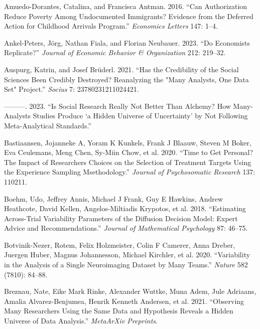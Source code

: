 \documentclass[
  letterpaper,
  DIV=11,
  numbers=noendperiod]{scrartcl}
\newlength{\cslhangindent}
\newlength{\cslentryspacingunit} %
\newenvironment{CSLReferences}[2] %
 {%
  \setlength{\parindent}{0pt}
  \ifodd #1
  \let\oldpar\par
  \def\par{\hangindent=\cslhangindent\oldpar}
  \fi
  \setlength{\parskip}{#2\cslentryspacingunit}
 }%
 {}
\begin{document}
\hypertarget{refs}{}
\begin{CSLReferences}{1}{0}
\leavevmode{}%
Amuedo-Dorantes, Catalina, and Francisca Antman. 2016. {``Can
Authorization Reduce Poverty Among Undocumented Immigrants? Evidence
from the Deferred Action for Childhood Arrivals Program.''}
\emph{Economics Letters} 147: 1--4.

\leavevmode{}%
Ankel-Peters, Jörg, Nathan Fiala, and Florian Neubauer. 2023. {``Do
Economists Replicate?''} \emph{Journal of Economic Behavior \&
Organization} 212: 219--32.

\leavevmode{}%
Auspurg, Katrin, and Josef Brüderl. 2021. {``Has the Credibility of the
Social Sciences Been Credibly Destroyed? Reanalyzing the "Many Analysts,
One Data Set" Project.''} \emph{Socius} 7: 23780231211024421.

\leavevmode{}%
---------. 2023. {``Is Social Research Really Not Better Than Alchemy?
How Many-Analysts Studies Produce {`a Hidden Universe of Uncertainty'}
by Not Following Meta-Analytical Standards.''}

\leavevmode{}%
Bastiaansen, Jojanneke A, Yoram K Kunkels, Frank J Blaauw, Steven M
Boker, Eva Ceulemans, Meng Chen, Sy-Miin Chow, et al. 2020. {``Time to
Get Personal? The Impact of Researchers Choices on the Selection of
Treatment Targets Using the Experience Sampling Msethodology.''}
\emph{Journal of Psychosomatic Research} 137: 110211.

\leavevmode{}%
Boehm, Udo, Jeffrey Annis, Michael J Frank, Guy E Hawkins, Andrew
Heathcote, David Kellen, Angelos-Miltiadis Krypotos, et al. 2018.
{``Estimating Across-Trial Variability Parameters of the Diffusion
Decision Model: Expert Advice and Recommendations.''} \emph{Journal of
Mathematical Psychology} 87: 46--75.

\leavevmode{}%
Botvinik-Nezer, Rotem, Felix Holzmeister, Colin F Camerer, Anna Dreber,
Juergen Huber, Magnus Johannesson, Michael Kirchler, et al. 2020.
{``Variability in the Analysis of a Single Neuroimaging Dataset by Many
Teams.''} \emph{Nature} 582 (7810): 84--88.

\leavevmode{}%
Breznau, Nate, Eike Mark Rinke, Alexander Wuttke, Muna Adem, Jule
Adriaans, Amalia Alvarez-Benjumea, Henrik Kenneth Andersen, et al. 2021.
{``Observing Many Researchers Using the Same Data and Hypothesis Reveals
a Hidden Universe of Data Analysis.''} \emph{MetaArXiv Preprints}.


\end{CSLReferences}
\end{document}
